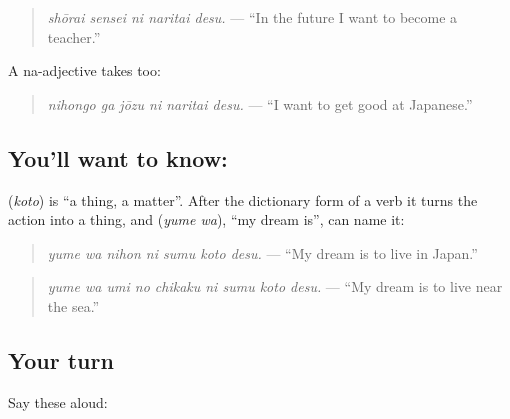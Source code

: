 \begin{quote}
\textbf{  }
\end{quote}

\begin{quote}
\emph{shōrai sensei ni naritai desu.} — \textquotedblleft{}In the future I want to become a teacher.\textquotedblright{}
\end{quote}

A na-adjective takes \textbf{} too:

\begin{quote}
\textbf{  }
\end{quote}

\begin{quote}
\emph{nihongo ga jōzu ni naritai desu.} — \textquotedblleft{}I want to get good at Japanese.\textquotedblright{}
\end{quote}

\subsection*{You'll want to know:  }
\textbf{} (\emph{koto}) is \textquotedblleft{}a thing, a matter\textquotedblright{}. After the dictionary form of a verb it turns the action into a thing, and \textbf{} (\emph{yume wa}), \textquotedblleft{}my dream is\textquotedblright{}, can name it:

\begin{quote}
\textbf{   }
\end{quote}

\begin{quote}
\emph{yume wa nihon ni sumu koto desu.} — \textquotedblleft{}My dream is to live in Japan.\textquotedblright{}
\end{quote}

\begin{quote}
\textbf{    }
\end{quote}

\begin{quote}
\emph{yume wa umi no chikaku ni sumu koto desu.} — \textquotedblleft{}My dream is to live near the sea.\textquotedblright{}
\end{quote}

\subsection*{Your turn}
Say these aloud:

